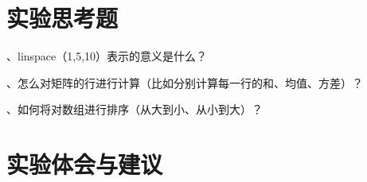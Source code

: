 \documentclass{sasreport}
\begin{document}
\section{实验思考题}
 {\large{}、linspace（1,5,10）表示的意义是什么？}

 {\large{}、怎么对矩阵的行进行计算（比如分别计算每一行的和、均值、方差）？}

 {\large{}、如何将对数组进行排序（从大到小、从小到大）？}

\section{实验体会与建议}
\end{document}
